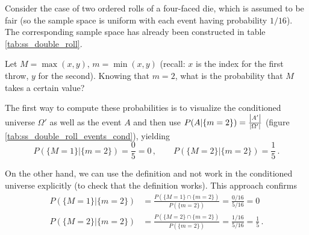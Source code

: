 \begin{ex}\label{ex:four_faced_die}
Consider the case of two ordered rolls of a four-faced die, which is assumed to be fair (so the sample space is uniform with each event having probability $1 / 16$). The corresponding sample space has already been constructed in table \ref{tab:ss_double_roll}.

Let $M = \max(x, y), \, m = \min(x, y)$ (recall: $x$ is the index for the first throw, $y$ for the second). Knowing that $m = 2$, what is the probability that $M$ takes a certain value?%

The first way to compute these probabilities is to visualize the conditioned universe $\Omega'$ as well as the event $A$ and then use $P(A | \{m = 2\}) = \frac{\abs{A'}}{\abs{\Omega'}}$ (figure \ref{tab:ss_double_roll_events_cond}), yielding
\begin{equation*}
P(\{M = 1\} | \{m = 2\}) = \frac{0}{5} = 0 \, , \qquad P(\{M = 2\} | \{m = 2\}) = \frac{1}{5} \, .
\end{equation*}


On the other hand, we can use the definition and not work in the conditioned universe explicitly (to check that the definition works). This approach confirms
\begin{align*}
P(\{M = 1\} | \{m = 2\}) &= \frac{P(\{M = 1\} \cap \{m = 2\})}{P(\{m = 2\})} = \frac{0 / 16}{5 / 16} = 0
\\
P(\{M = 2\} | \{m = 2\}) &= \frac{P(\{M = 2\} \cap \{m = 2\})}{P(\{m = 2\})} = \frac{1 / 16}{5 / 16} = \frac{1}{5} \, .
\end{align*}
\end{ex}



